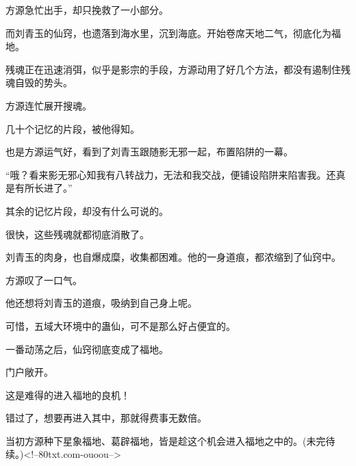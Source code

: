 \begin{this_body}
方源急忙出手，却只挽救了一小部分。

而刘青玉的仙窍，也遗落到海水里，沉到海底。开始卷席天地二气，彻底化为福地。

残魂正在迅速消弭，似乎是影宗的手段，方源动用了好几个方法，都没有遏制住残魂自毁的势头。

方源连忙展开搜魂。

几十个记忆的片段，被他得知。

也是方源运气好，看到了刘青玉跟随影无邪一起，布置陷阱的一幕。

“哦？看来影无邪心知我有八转战力，无法和我交战，便铺设陷阱来陷害我。还真是有所长进了。”

其余的记忆片段，却没有什么可说的。

很快，这些残魂就都彻底消散了。

刘青玉的肉身，也自爆成糜，收集都困难。他的一身道痕，都浓缩到了仙窍中。

方源叹了一口气。

他还想将刘青玉的道痕，吸纳到自己身上呢。

可惜，五域大环境中的蛊仙，可不是那么好占便宜的。

一番动荡之后，仙窍彻底变成了福地。

门户敞开。

这是难得的进入福地的良机！

错过了，想要再进入其中，那就得费事无数倍。

当初方源种下星象福地、葛辟福地，皆是趁这个机会进入福地之中的。(未完待续。)<!--80txt.com-ouoou-->

\end{this_body}

